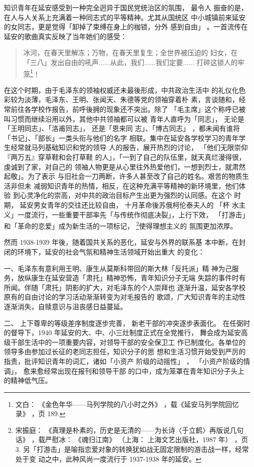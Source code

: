 知识青年在延安感受到一种完全迥异于国民党统治区的氛围，
最令人
振奋的是，在人与人关系上充满着一种同志式的平等精神。尤其从国统区
中小城镇前来延安的女同志，更是觉得「卸掉了束缚在身上的枷锁，分外
感到自由」
。一首流传在延安的歌曲真实反映了当年她们的感受：
\begin{quote}
{\fzwkai 冰河，在春天里解冻；万物，在春天里复生；全世界被压迫的
妇女，在「三八」发出自由的吼声......从此，我们......我们定要......
打碎这锁人的牢笼\footnote{文白：
《金色年华——马列学院的八小时之外》
，载《延安马列学院回忆录》
，页 189.}！}
\end{quote}
在这个时期，由于毛泽东的领袖权威还未最後形成，中共政治生活中
的礼仪化色彩较为淡薄，毛泽东、王明、张闻天、朱德等党的领袖穿着朴
素，言谈随和，经常前往各学校作报告，前呼後拥的现象还不突出。除了
「毛主席」这个称呼已被叫习惯而继续沿用以外，其他中共领袖都可以被
青年人直呼为「同志」，
无论是「王明同志」、「洛甫同志」，
还是「恩来同
志」、「博古同志」
，都未闻有谁将「书记」、「部长」一类头衔与他们的名字
相联。集中在延安各学校学习的青年学生经常就马列基础知识和党的领导
人的报告，展开热烈的讨论，
「他们无限崇仰『两万五』穿草鞋和会打草鞋
的人」，「一到了自己的队伍里，就天真烂漫得很，虔诚到了家，对自己的
领袖人物更是从心里往外热爱他们，一想到烈士，就肃然起敬」。为了表示
与旧社会一刀两断，许多人甚至改了自己的姓名。艰苦的物质生活非但未
减弱知识青年的热情，相反，在这种充满平等精神的新环境里，他们体验
到心灵净化的崇高，对中共的政治目标产生出更为强烈的认同感。在这个
时期，
延安男女青年的交往还比较自由，
十月革命後苏俄柯伦泰夫人的
「杯
水主义」一度流行，一些重要干部率先「与传统作彻底决裂」，上行下效，
「打游击」和「革命的恋爱」成为新生活的一项标记， \footnote{宋振庭：
《真理是朴素的，历史是无清的——为长诗〈于立鹤〉再版说几句话》
，载严慰冰：
《魂归江南》
（上海：
上海文艺出版社，1987 年）
，页 3. 另「打游击」是喻指恋爱对象的转换犹如战无固定限制的游击战一样，经常处于变
动之中，此种风尚一度流行于 1937-1938 年的延安。
}使得理想主义的
氛围更加浓厚。

然而 1938-1939 年後，随着国共关系的恶化，延安与外界的联系基
本中断，在封闭的环境下，延安的社会气氛和精神生活领域开始出重大
的变化：

一、毛泽东有意利用王明、康生从莫斯科带回的斯大林「反托派」精
神为己服务，放纵康生在延安营造「肃托」精神恐怖，青年知识分子无端
失踪的事件时有所闻。伴随「肃托」阴影的扩大，对毛泽东的个人崇拜也
逐渐升温，延安各学校原有的自由讨论的学习活动渐渐转变为对毛报告的
歌颂，广大知识青年的主动性逐渐消失，自赎意识与沮丧感日益蔓延。

二、
上下尊卑的等级差序制度逐步完善，
新老干部的冲突逐步表面化。
在任弼时的督导下，1940 年延安的大、中、小三灶制度正式在全党推行，
舞会成为延安高级干部生活中的一项重要内容，对领导干部的安全保卫工
作已制度化。各单位的领导多由参加过长征的老同志担任，知识分子的思
想和生活习惯开始受到严厉的指责，批评知识青年的词汇，诸如「小资产
阶级的动摇性」
，
「小资产阶级的情调」， 愈来愈经常出现在报刊和领导干部
的口中，成为笼罩在青年知识分子头上的精神低气压。

